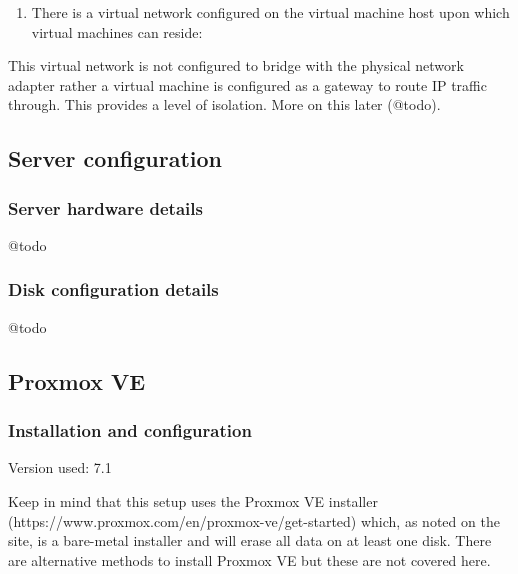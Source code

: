 \begin{enumerate}
\def\labelenumi{\arabic{enumi}.}
\setcounter{enumi}{1}
\tightlist
\item
  There is a virtual network configured on the virtual machine host upon
  which virtual machines can reside:
\end{enumerate}

This virtual network is not configured to bridge with the physical
network adapter rather a virtual machine is configured as a gateway to
route IP traffic through. This provides a level of isolation. More on
this later (@todo).

\hypertarget{server-configuration}{%
\subsection{Server configuration}\label{server-configuration}}

\hypertarget{server-hardware-details}{%
\subsubsection{Server hardware details}\label{server-hardware-details}}

@todo

\hypertarget{disk-configuration-details}{%
\subsubsection{Disk configuration
details}\label{disk-configuration-details}}

@todo

\hypertarget{proxmox-ve}{%
\subsection{Proxmox VE}\label{proxmox-ve}}

\hypertarget{installation-and-configuration}{%
\subsubsection{Installation and
configuration}\label{installation-and-configuration}}

Version used: 7.1

Keep in mind that this setup uses the Proxmox VE installer
(https://www.proxmox.com/en/proxmox-ve/get-started) which, as noted on
the site, is a bare-metal installer and will erase all data on at least
one disk. There are alternative methods to install Proxmox VE but these
are not covered here.

